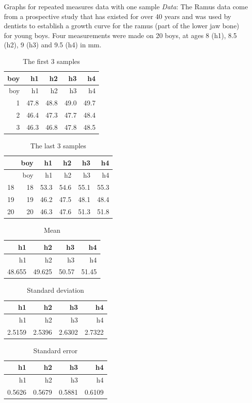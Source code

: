 \documentclass[
  9pt,
  ignorenonframetext,
]{beamer}
\begin{document}
\begin{frame}{Graphs for repeated measures data with one sample}
\protect\hypertarget{graphs-for-repeated-measures-data-with-one-sample}{}
\emph{Data}: The Ramus data come from a prospective study that has
existed for over 40 years and was used by dentists to establish a growth
curve for the ramus (part of the lower jaw bone) for young boys. Four
measurements were made on 20 boys, at ages 8 (h1), 8.5 (h2), 9 (h3) and
9.5 (h4) in mm.

\tiny

\begin{longtable}[]{@{}rrrrr@{}}
\caption{The first 3 samples}\tabularnewline
\toprule
boy & h1 & h2 & h3 & h4\tabularnewline
\midrule
\endfirsthead
\toprule
boy & h1 & h2 & h3 & h4\tabularnewline
\midrule
\endhead
1 & 47.8 & 48.8 & 49.0 & 49.7\tabularnewline
2 & 46.4 & 47.3 & 47.7 & 48.4\tabularnewline
3 & 46.3 & 46.8 & 47.8 & 48.5\tabularnewline
\bottomrule
\end{longtable}

\begin{longtable}[]{@{}lrrrrr@{}}
\caption{The last 3 samples}\tabularnewline
\toprule
& boy & h1 & h2 & h3 & h4\tabularnewline
\midrule
\endfirsthead
\toprule
& boy & h1 & h2 & h3 & h4\tabularnewline
\midrule
\endhead
18 & 18 & 53.3 & 54.6 & 55.1 & 55.3\tabularnewline
19 & 19 & 46.2 & 47.5 & 48.1 & 48.4\tabularnewline
20 & 20 & 46.3 & 47.6 & 51.3 & 51.8\tabularnewline
\bottomrule
\end{longtable}

\tiny
\end{frame}

\begin{frame}{}
\protect\hypertarget{section}{}
\tiny

\begin{longtable}[]{@{}rrrr@{}}
\caption{Mean}\tabularnewline
\toprule
h1 & h2 & h3 & h4\tabularnewline
\midrule
\endfirsthead
\toprule
h1 & h2 & h3 & h4\tabularnewline
\midrule
\endhead
48.655 & 49.625 & 50.57 & 51.45\tabularnewline
\bottomrule
\end{longtable}

\begin{longtable}[]{@{}rrrr@{}}
\caption{Standard deviation}\tabularnewline
\toprule
h1 & h2 & h3 & h4\tabularnewline
\midrule
\endfirsthead
\toprule
h1 & h2 & h3 & h4\tabularnewline
\midrule
\endhead
2.5159 & 2.5396 & 2.6302 & 2.7322\tabularnewline
\bottomrule
\end{longtable}

\begin{longtable}[]{@{}rrrr@{}}
\caption{Standard error}\tabularnewline
\toprule
h1 & h2 & h3 & h4\tabularnewline
\midrule
\endfirsthead
\toprule
h1 & h2 & h3 & h4\tabularnewline
\midrule
\endhead
0.5626 & 0.5679 & 0.5881 & 0.6109\tabularnewline
\bottomrule
\end{longtable}

\tiny
\end{frame}
\end{document}
